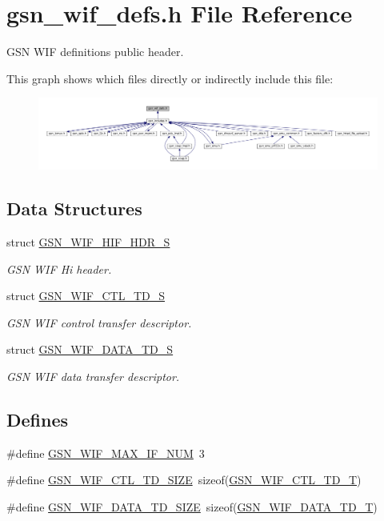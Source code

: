 \hypertarget{a00610}{
\section{gsn\_\-wif\_\-defs.h File Reference}
\label{a00610}
}


GSN WIF definitions public header.  


This graph shows which files directly or indirectly include this file:
\nopagebreak
\begin{figure}[H]
\begin{center}
\leavevmode
\includegraphics[width=400pt]{a00857}
\end{center}
\end{figure}
\subsection*{Data Structures}
\begin{DoxyCompactItemize}
\item 
struct \hyperlink{a00337}{GSN\_\-WIF\_\-HIF\_\-HDR\_\-S}
\begin{DoxyCompactList}\small\item\em GSN WIF Hi header. \end{DoxyCompactList}\item 
struct \hyperlink{a00322}{GSN\_\-WIF\_\-CTL\_\-TD\_\-S}
\begin{DoxyCompactList}\small\item\em GSN WIF control transfer descriptor. \end{DoxyCompactList}\item 
struct \hyperlink{a00325}{GSN\_\-WIF\_\-DATA\_\-TD\_\-S}
\begin{DoxyCompactList}\small\item\em GSN WIF data transfer descriptor. \end{DoxyCompactList}\end{DoxyCompactItemize}
\subsection*{Defines}
\begin{DoxyCompactItemize}
\item 
\#define \hyperlink{a00610_a227770e4a8a8653b7e1335fbe857bf83}{GSN\_\-WIF\_\-MAX\_\-IF\_\-NUM}~3
\item 
\#define \hyperlink{a00610_ad58fc93b48c98eed4245b922b60b9398}{GSN\_\-WIF\_\-CTL\_\-TD\_\-SIZE}~sizeof(\hyperlink{a00322}{GSN\_\-WIF\_\-CTL\_\-TD\_\-T})
\item 
\#define \hyperlink{a00610_a2a36db8c9237847322be3065c9ed0aa3}{GSN\_\-WIF\_\-DATA\_\-TD\_\-SIZE}~sizeof(\hyperlink{a00325}{GSN\_\-WIF\_\-DATA\_\-TD\_\-T})
\end{DoxyCompactItemize}
